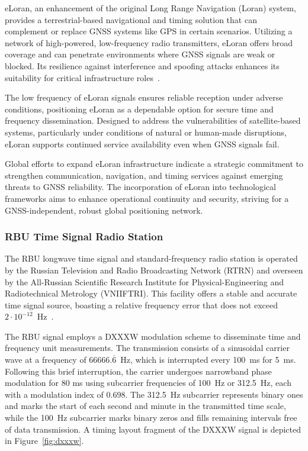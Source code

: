 \documentclass[12pt, a4paper]{extarticle}
\begin{document}
eLoran, an enhancement of the original Long Range Navigation (Loran) system,
provides a terrestrial-based navigational and timing solution that can
complement or replace GNSS systems like GPS in certain scenarios. Utilizing a
network of high-powered, low-frequency radio transmitters, eLoran offers broad
coverage and can penetrate environments where GNSS signals are weak or blocked.
Its resilience against interference and spoofing attacks enhances its
suitability for critical infrastructure roles~\cite{eloran}.

The low frequency of eLoran signals ensures reliable reception under adverse
conditions, positioning eLoran as a dependable option for secure time and frequency
dissemination. Designed to address the vulnerabilities of satellite-based
systems, particularly under conditions of natural or human-made disruptions,
eLoran supports continued service availability even when GNSS signals fail.

Global efforts to expand eLoran infrastructure indicate a strategic commitment
to strengthen communication, navigation, and timing services against emerging
threats to GNSS reliability. The incorporation of eLoran into technological
frameworks aims to enhance operational continuity and security, striving for a
GNSS-independent, robust global positioning network.

\subsubsection{RBU Time Signal Radio Station}\label{section:rbu}

The RBU longwave time signal and standard-frequency radio station is operated
by the Russian Television and Radio Broadcasting Network (RTRN) and overseen by
the All-Russian Scientific Research Institute for Physical-Engineering and
Radiotechnical Metrology (VNIIFTRI). This facility offers a stable and accurate
time signal source, boasting a relative frequency error that does not exceed $2
\cdot 10^{-12}$~Hz~\cite{vniiftri}.

The RBU signal employs a DXXXW modulation scheme to disseminate time and
frequency unit measurements. The transmission consists of a sinusoidal carrier
wave at a frequency of $66666.\overline{6}$~Hz, which is interrupted every 100~ms for
5~ms. Following this brief interruption, the carrier undergoes narrowband phase
modulation for 80 ms using subcarrier frequencies of 100~Hz or 312.5~Hz, each
with a modulation index of 0.698. The 312.5~Hz subcarrier represents binary
ones and marks the start of each second and minute in the transmitted time
scale, while the 100~Hz subcarrier marks binary zeros and fills remaining
intervals free of data transmission. A timing layout fragment of the DXXXW
signal is depicted in Figure~\ref{fig:dxxxw}.
\end{document}
